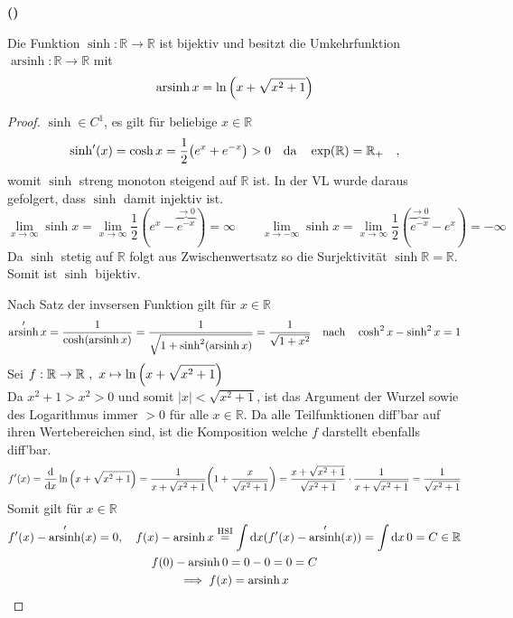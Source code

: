 \documentclass[a4paper, 12pt]{scrartcl}
\DeclareMathOperator{\arsinh}{arsinh}
\newcounter{taski}
\newcounter{taskii}[taski]
\newcommand{\ttask}{\stepcounter{taskii}\textbf{(\alph{taskii})}~}
\begin{document}
\ttask
\begin{theorem}
    Die Funktion $\sinh : \mathbb{R} \rightarrow \mathbb{R}$ ist bijektiv und besitzt die Umkehrfunktion $\arsinh : \mathbb{R} \rightarrow \mathbb{R}$ mit
    \[ \arsinh x = \ln \qty(x+\sqrt{x^2+1}) \]
\end{theorem}
\begin{proof}
$\sinh \in C^1$, es gilt für beliebige $x \in \mathbb{R}$
\[ \sinh'(x) = \cosh x = \frac{1}{2}\qty(e^x + e^{-x}) > 0 \qq{da} \exp(\mathbb{R}) = \mathbb{R_+} \quad, \]
womit $\sinh$ streng monoton steigend auf $\mathbb{R}$ ist. In der VL wurde daraus gefolgert, dass $\sinh$ damit injektiv ist.
\[
    \lim_{x \rightarrow \infty} \sinh x =  \lim_{x \rightarrow \infty} \frac{1}{2}(e^x - \overbrace{e^{-x}}^{\rightarrow 0}) = \infty \qquad \lim_{x \rightarrow -\infty} \sinh x =  \lim_{x \rightarrow \infty} \frac{1}{2}(\overbrace{e^{-x}}^{\rightarrow 0} - e^{x}) = -\infty
\]
Da $\sinh$ stetig auf $\mathbb{R}$ folgt aus Zwischenwertsatz so die Surjektivität $\sinh \mathbb{R} = \mathbb{R}$. Somit ist $\sinh$ bijektiv.

Nach Satz der invsersen Funktion gilt für $x \in \mathbb{R}$
\[
\arsinh'x = \frac{1}{\cosh(\arsinh x)}
= \frac{1}{\sqrt{1 + \sinh^2(\arsinh x)}}
= \frac{1}{\sqrt{1+x^2}}  \qq{nach} \cosh^2 x - \sinh^2 x = 1
\]
Sei $\displaystyle f: \mathbb{R} \rightarrow \mathbb{R} ~,~ x \mapsto \ln \qty(x+\sqrt{x^2+1})$ \\
Da $x^2+1 > x^2 > 0$ und somit $|x| < \sqrt{x^2+1}$, ist das Argument der Wurzel sowie des Logarithmus immer $>0$ für alle $x \in \mathbb{R}$. Da alle Teilfunktionen diff'bar auf ihren Wertebereichen sind, ist die Komposition welche $f$ darstellt ebenfalls diff'bar.
\[ 
    f'(x) = \dv{x} \ln \qty(x+\sqrt{x^2+1})
    = \frac{1}{x+\sqrt{x^2+1}} \qty(1+\frac{x}{\sqrt{x^2+1}})
    = \frac{x+\sqrt{x^2+1}}{\sqrt{x^2+1}} \cdot \frac{1}{x+\sqrt{x^2+1}}
    = \frac{1}{\sqrt{x^2+1}} 
\]
Somit gilt für $x \in \mathbb{R}$
\begin{gather*}
    f'(x) - \arsinh'(x) = 0 \qc f(x) - \arsinh x \overset{\text{HSI}}= \int \dd x (f'(x) - \arsinh'(x)) = \int \dd x \, 0 = C \in \mathbb{R}\\
    f(0) - \arsinh 0 = 0 - 0 = 0 = C \\
    \implies f(x) = \arsinh x
\end{gather*}
\end{proof}
\end{document}
